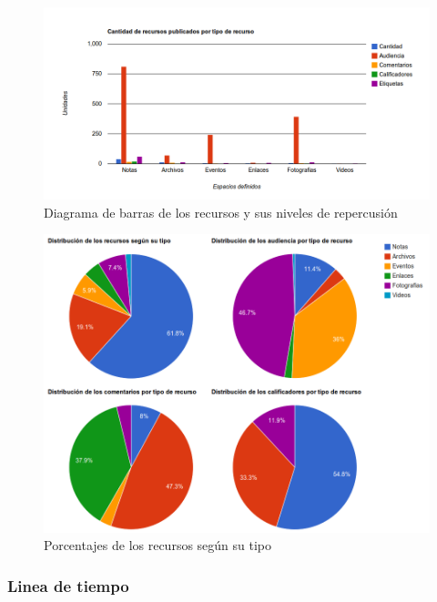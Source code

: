 \begin{figure}[H]
\centering
    \includegraphics[scale=0.4]{graphics/recursos_bars_1.png}
    \caption {Diagrama de barras de los recursos y sus niveles de repercusi\'on}
    \label {recursos_bars_1}
\end{figure}

\begin{figure}[H]
\centering
    \includegraphics[scale=0.4]{graphics/recursos_pie_1.png}
    \caption {Porcentajes de los recursos seg\'un su tipo}
    \label {recursos_pie_1}
\end{figure}

\subsubsection{Linea de tiempo}

